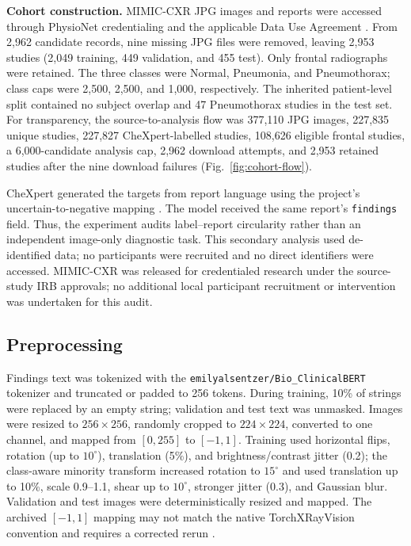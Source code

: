 \textbf{Cohort construction.}
MIMIC-CXR JPG images and reports were accessed through PhysioNet credentialing
and the applicable Data Use Agreement \citep{johnson2019mimiccxr}. From 2,962
candidate records, nine missing JPG files were removed, leaving 2,953 studies
(2,049 training, 449 validation, and 455 test). Only frontal radiographs were
retained. The three classes were Normal, Pneumonia, and Pneumothorax; class
caps were 2,500, 2,500, and 1,000, respectively. The inherited patient-level
split contained no subject overlap and 47 Pneumothorax studies in the test set.
For transparency, the source-to-analysis flow was 377,110 JPG images, 227,835
unique studies, 227,827 CheXpert-labelled studies, 108,626 eligible frontal
studies, a 6,000-candidate analysis cap, 2,962 download attempts, and 2,953
retained studies after the nine download failures (Fig.~\ref{fig:cohort-flow}).

CheXpert generated the targets from report language using the project’s
uncertain-to-negative mapping \citep{irvin2019chexpert}. The model received the
same report’s \texttt{findings} field. Thus, the experiment audits
label--report circularity rather than an independent image-only diagnostic
task. This secondary analysis used de-identified data; no participants were
recruited and no direct identifiers were accessed. MIMIC-CXR was released for
credentialed research under the source-study IRB approvals; no additional
local participant recruitment or intervention was undertaken for this audit.

\subsection{Preprocessing}\label{sec:preprocessing}
Findings text was tokenized with the
\texttt{emilyalsentzer/Bio\_ClinicalBERT} tokenizer and truncated or padded to
256 tokens. During training, 10\% of strings were replaced by an empty string;
validation and test text was unmasked. Images were resized to $256\times256$,
randomly cropped to $224\times224$, converted to one channel, and mapped from
$[0,255]$ to $[-1,1]$. Training used horizontal flips, rotation (up to
$10^{\circ}$), translation (5\%), and brightness/contrast jitter (0.2); the
class-aware minority transform increased rotation to $15^{\circ}$ and used
translation up to 10\%, scale 0.9--1.1, shear up to $10^{\circ}$, stronger
jitter (0.3), and Gaussian blur. Validation and test images were deterministically
resized and mapped. The archived $[-1,1]$ mapping may not match the native
TorchXRayVision convention and requires a corrected rerun
\citep{cohen2022torchxrayvision}.

